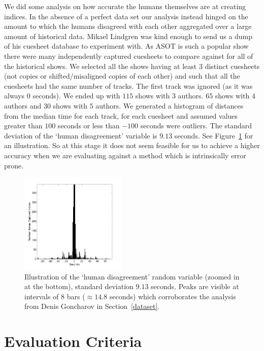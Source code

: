 \documentclass[twocolumn]{article}
\begin{document}
	We did some analysis on how accurate the humans themselves are at creating indices. In the absence of a perfect data set our analysis instead hinged on the amount to which the humans disagreed with each other aggregated over a large amount of historical data. Mikael Lindgren was kind enough to send us a dump of his cuesheet database to experiment with. As ASOT is such a popular show there were many independently captured cuesheets to compare against for all of the historical shows. We selected all the shows having at least $3$ distinct cuesheets (not copies or shifted/misaligned copies of each other)  and such that all the cuesheets had the same number of tracks. The first track was ignored (as it was always $0$ seconds). We ended up with $115$ shows with $3$ authors. $65$ shows with $4$ authors and $30$ shows with $5$ authors.  We generated a histogram of distances from the median time for each track, for each cuesheet and assumed values greater than $100$ seconds or less than $-100$ seconds were outliers. The standard deviation of the `human disagreement' variable is $9.13$ seconds. See Figure~\ref{fig:human_muchconfuse} for an illustration. So at this stage it does not seem feasible for us to achieve a higher accuracy when we are evaluating against a method which is intrinsically error prone.
	
	\begin{figure}
		\centering
		\includegraphics[width=0.45\textwidth]{images/human_confusion}
		
		\caption{Illustration of the `human disagreement' random variable (zoomed in at the bottom), standard deviation $9.13$ seconds. Peaks are visible at intervals of $8$ bars ($\approx 14.8$ seconds) which corroborates the analysis from Denis Goncharov in Section~\ref{dataset}. }
		\label{fig:human_muchconfuse}
	\end{figure} 
	
	   
	
	\section{Evaluation Criteria}\label{eval_crit}
	
\end{document}
